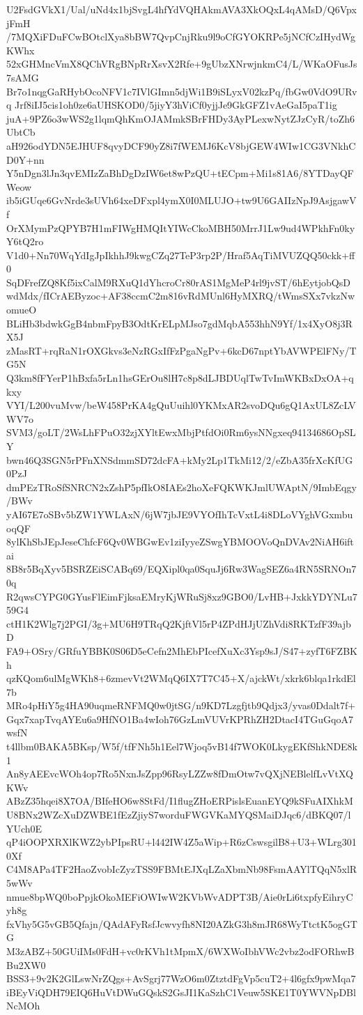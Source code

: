 U2FsdGVkX1/Ual/uNd4x1bjSvgL4hfYdVQHAkmAVA3XkOQxL4qAMsD/Q6VpxjFmH
/7MQXiFDuFCwBOtclXya8bBW7QvpCnjRku9l9oCfGYOKRPe5jNCfCzIHydWgKWhx
52xGHMncVmX8QChVRgBNpRrXsvX2Rfe+9gUbzXNrwjnkmC4/L/WKaOFusJs7sAMG
Br7o1nqgGaRHybOcoNFV1c7IVlGImn5djWi1B9iSLyxV02kzPq/fbGw0VdO9URvq
Jrf8iIJ5cis1oh0ze6aUHSKOD0/5jiyY3hViCf0yjjJe9GkGFZ1vAeGaI5paT1ig
juA+9PZ6o3wWS2g1lqmQhKmOJAMmkSBrFHDy3AyPLexwNytZJzCyR/toZh6UbtCb
aH926odYDN5EJHUF8qvyDCF90yZ8i7fWEMJ6KcV8bjGEW4WIw1CG3VNkhCD0Y+nn
Y5nDgn3lJn3qvEMIzZaBhDgDzIW6et8wPzQU+tECpm+Mi1s81A6/8YTDayQFWeow
ib5iGUqe6GvNrde3sUVh64xeDFxpl4ymX0I0MLUJO+tw9U6GAIIzNpJ9AsjgawVf
OrXMymPzQPYB7H1mFIWgHMQItYIWcCkoMBH50MrrJ1Lw9ud4WPkhFn0kyY6tQ2ro
V1d0+Nn70WqYdIgJpIkhhJ9kwgCZq27TeP3rp2P/Hraf5AqTiMVUZQQ50ckk+ff0
SqDFrefZQ8Kf5ixCalM9RXuQ1dYhcroCr80rAS1MgMeP4rl9jvST/6hEytjobQsD
wdMdx/fICrAEByzoc+AF38ccmC2m816vRdMUnl6HyMXRQ/tWmsSXx7vkzNwomueO
BLiHb3bdwkGgB4nbmFpyB3OdtKrELpMJso7gdMqbA553hhN9Yf/1x4XyO8j3RX5J
zMasRT+rqRaN1rOXGkvs3eNzRGxIfFzPgaNgPv+6kcD67nptYbAVWPElFNy/TG5N
Q3km8fFYerP1hBxfa5rLn1hsGErOu8lH7c8p8dLJBDUqlTwTvImWKBxDxOA+qkxy
VYI/L200vuMvw/beW458PrKA4gQuUuihl0YKMxAR2svoDQu6gQ1AxUL8ZcLVWV7o
SVM3/goLT/2WsLhFPuO32zjXYltEwxMbjPtfdOi0Rm6ysNNgxeq94134686OpSLY
bwn46Q3SGN5rPFnXNSdmmSD72dcFA+kMy2Lp1TkMi12/2/eZbA35frXcKfUG0PzJ
dmPEzTRoSfSNRCN2xZshP5pfIkO8IAEs2hoXeFQKWKJmlUWAptN/9ImbEqgy/BWv
yAI67E7oSBv5bZW1YWLAxN/6jW7jbJE9VYOfIhTcVxtL4i8DLoVYghVGxmbuoqQF
8ylKhSbJEpJeseChfcF6Qv0WBGwEv1ziIyyeZSwgYBMOOVoQnDVAv2NiAH6iftai
8B8r5BqXyv5BSRZEiSCABq69/EQXipl0qa0SquJj6Rw3WagSEZ6a4RN5SRNOn70q
R2qwsCYPG0GYusFlEimFjksaEMryKjWRuSj8xz9GBO0/LvHB+JxkkYDYNLu759G4
ctH1K2Wlg7j2PGI/3g+MU6H9TRqQ2KjftVl5rP4ZPdHJjUZhVdi8RKTzfF39ajbD
FA9+OSry/GRfuYBBK0S06D5eCefn2MhEbPIcefXuXc3Ysp9sJ/S47+zyfT6FZBKh
qzKQom6ulMgWKh8+6zmevVt2WMqQ6IX7T7C45+X/ajckWt/xkrk6blqa1rkdEl7b
MRo4pHiY5g4HA90uqmeRNFMQ0w0jtSG/n9KD7Lzgfjtb9Qdjx3/yvas0Ddalt7f+
Gqx7xapTvqAYEu6a9HfNO1Ba4wIoh76GzLmVUVrKPRhZH2DtacI4TGuGqoA7wsfN
t4llbm0BAKA5BKsp/W5f/tfFNh5h1Eel7Wjoq5vB14f7WOK0LkygEKfShkNDE8k1
An8yAEEvcWOh4op7Ro5NxnJsZpp96RsyLZZw8fDmOtw7vQXjNEBlelfLvVtXQKWv
ABzZ35hqei8X7OA/BIfeHO6w8StFd/I1flugZHoERPislsEuanEYQ9kSFuAIXhkM
U8BNx2WZcXuDZWBE1fEzZjiyS7worduFWGVKaMYQSMaiDJqc6/dBKQ07/lYUch0E
qP4iOOPXRXlKWZ2ybPIpsRU+l442IW4Z5aWip+R6zCswsgilB8+U3+WLrg3010Xf
C4M8APa4TF2HaoZvobIcZyzTSS9FBMtEJXqLZaXbmNb98FsmAAYlTQqN5xlR5wWv
nmue8bpWQ0boPpjkOkoMEFiOWIwW2KVbWvADPT3B/Aie0rLi6txpfyEihryCyh8g
fxVhy5G5vGB5Qfajn/QAdAFyRsfJcwvyfh8NI20AZkG3h8mJR68WyTtctK5ogGTG
M3zABZ+50GUiIMs0FdH+vc0rKVh1tMpmX/6WXWoIbhVWc2vbz2odFORhwBBu2XW0
BSS3+9v2K2GlLswNrZQgs+AvSgrj77WzO6m0ZtztdFgVp5cuT2+4l6gfx9pwMqa7
iBEyViQDH79EIQ6HuVtDWuGQskS2GsJI1KaSzhC1Veuw5SKE1T0YWVNpDBlNcMOh
